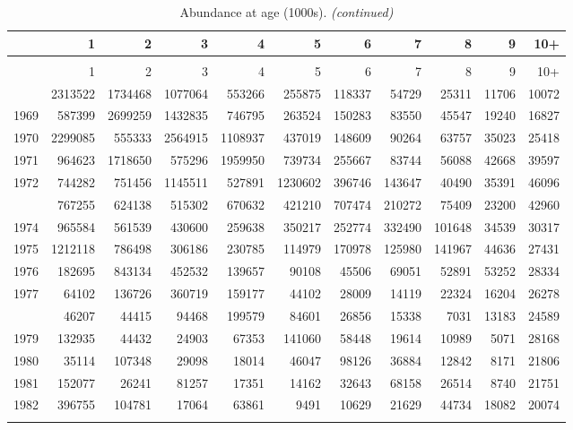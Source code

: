 \documentclass[
]{article}
\begin{document}
\begin{longtable}[t]{lrrrrrrrrrr}
\caption{\label{tab:NAA-table}Abundance at age (1000s).}\\
\toprule
  & 1 & 2 & 3 & 4 & 5 & 6 & 7 & 8 & 9 & 10+\\
\midrule
\endfirsthead
\caption[]{Abundance at age (1000s). \textit{(continued)}}\\
\toprule
  & 1 & 2 & 3 & 4 & 5 & 6 & 7 & 8 & 9 & 10+\\
\midrule
\endhead

\endfoot
\bottomrule
\endlastfoot
1968 & 2313522 & 1734468 & 1077064 & 553266 & 255875 & 118337 & 54729 & 25311 & 11706 & 10072\\
1969 & 587399 & 2699259 & 1432835 & 746795 & 263524 & 150283 & 83550 & 45547 & 19240 & 16827\\
1970 & 2299085 & 555333 & 2564915 & 1108937 & 437019 & 148609 & 90264 & 63757 & 35023 & 25418\\
1971 & 964623 & 1718650 & 575296 & 1959950 & 739734 & 255667 & 83744 & 56088 & 42668 & 39597\\
1972 & 744282 & 751456 & 1145511 & 527891 & 1230602 & 396746 & 143647 & 40490 & 35391 & 46096\\
\addlinespace
1973 & 767255 & 624138 & 515302 & 670632 & 421210 & 707474 & 210272 & 75409 & 23200 & 42960\\
1974 & 965584 & 561539 & 430600 & 259638 & 350217 & 252774 & 332490 & 101648 & 34539 & 30317\\
1975 & 1212118 & 786498 & 306186 & 230785 & 114979 & 170978 & 125980 & 141967 & 44636 & 27431\\
1976 & 182695 & 843134 & 452532 & 139657 & 90108 & 45506 & 69051 & 52891 & 53252 & 28334\\
1977 & 64102 & 136726 & 360719 & 159177 & 44102 & 28009 & 14119 & 22324 & 16204 & 26278\\
\addlinespace
1978 & 46207 & 44415 & 94468 & 199579 & 84601 & 26856 & 15338 & 7031 & 13183 & 24589\\
1979 & 132935 & 44432 & 24903 & 67353 & 141060 & 58448 & 19614 & 10989 & 5071 & 28168\\
1980 & 35114 & 107348 & 29098 & 18014 & 46047 & 98126 & 36884 & 12842 & 8171 & 21806\\
1981 & 152077 & 26241 & 81257 & 17351 & 14162 & 32643 & 68158 & 26514 & 8740 & 21751\\
1982 & 396755 & 104781 & 17064 & 63861 & 9491 & 10629 & 21629 & 44734 & 18082 & 20074\\
\addlinespace

\end{longtable}
\end{document}
